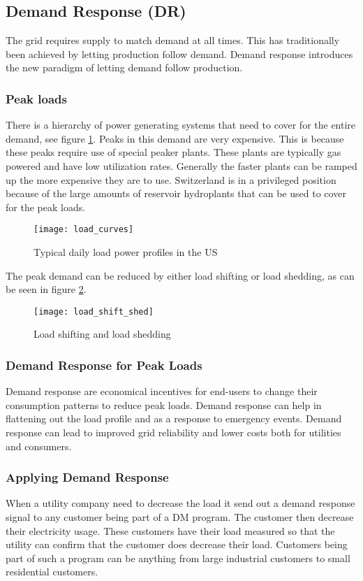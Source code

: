 \subsection{Demand Response (DR)}
The grid requires supply to match demand at all times.
This has traditionally been achieved by letting production follow demand.
Demand response introduces the new paradigm of letting demand follow production.

\subsubsection{Peak loads}
There is a hierarchy of power generating systems that need to cover for the entire demand, see figure \ref{fig:load_curves}.
Peaks in this demand are very expensive.
This is because these peaks require use of special peaker plants.
These plants are typically gas powered and have low utilization rates.
Generally the faster plants can be ramped up the more expensive they are to use.
Switzerland is in a privileged position because of the large amounts of reservoir hydroplants that can be used to cover for the peak loads.\\

\begin{figure}
    \centering
    \texttt{[image: load\_curves]}
    \caption{Typical daily load power profiles in the US}
    \label{fig:load_curves}
\end{figure}

The peak demand can be reduced by either load shifting or load shedding, as can be seen in figure \ref{fig:load_shift_shed}.

\begin{figure}
    \centering
    \texttt{[image: load\_shift\_shed]}
    \caption{Load shifting and load shedding}
    \label{fig:load_shift_shed}
\end{figure}

\subsubsection{Demand Response for Peak Loads}
Demand response are economical incentives for end-users to change their consumption patterns to reduce peak loads.
Demand response can help in flattening out the load profile and as a response to emergency events.
Demand response can lead to improved grid reliability and lower costs both for utilities and consumers.

\subsubsection{Applying Demand Response}
When a utility company need to decrease the load it send out a demand response signal to any customer being part of a DM program.
The customer then decrease their electricity usage.
These customers have their load measured so that the utility can confirm that the customer does decrease their load.
Customers being part of such a program can be anything from large industrial customers to small residential customers.\\

